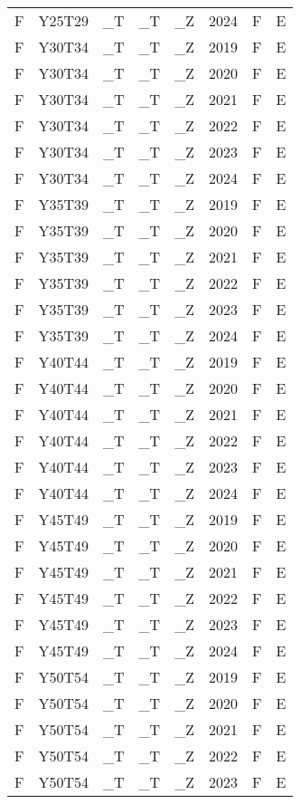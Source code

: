 \begin{longtable}[t]{llllllll}
F & Y25T29 & \_T & \_T & \_Z & 2024 & F & E\\
F & Y30T34 & \_T & \_T & \_Z & 2019 & F & E\\
F & Y30T34 & \_T & \_T & \_Z & 2020 & F & E\\
\addlinespace
F & Y30T34 & \_T & \_T & \_Z & 2021 & F & E\\
F & Y30T34 & \_T & \_T & \_Z & 2022 & F & E\\
F & Y30T34 & \_T & \_T & \_Z & 2023 & F & E\\
F & Y30T34 & \_T & \_T & \_Z & 2024 & F & E\\
F & Y35T39 & \_T & \_T & \_Z & 2019 & F & E\\
\addlinespace
F & Y35T39 & \_T & \_T & \_Z & 2020 & F & E\\
F & Y35T39 & \_T & \_T & \_Z & 2021 & F & E\\
F & Y35T39 & \_T & \_T & \_Z & 2022 & F & E\\
F & Y35T39 & \_T & \_T & \_Z & 2023 & F & E\\
F & Y35T39 & \_T & \_T & \_Z & 2024 & F & E\\
\addlinespace
F & Y40T44 & \_T & \_T & \_Z & 2019 & F & E\\
F & Y40T44 & \_T & \_T & \_Z & 2020 & F & E\\
F & Y40T44 & \_T & \_T & \_Z & 2021 & F & E\\
F & Y40T44 & \_T & \_T & \_Z & 2022 & F & E\\
F & Y40T44 & \_T & \_T & \_Z & 2023 & F & E\\
\addlinespace
F & Y40T44 & \_T & \_T & \_Z & 2024 & F & E\\
F & Y45T49 & \_T & \_T & \_Z & 2019 & F & E\\
F & Y45T49 & \_T & \_T & \_Z & 2020 & F & E\\
F & Y45T49 & \_T & \_T & \_Z & 2021 & F & E\\
F & Y45T49 & \_T & \_T & \_Z & 2022 & F & E\\
\addlinespace
F & Y45T49 & \_T & \_T & \_Z & 2023 & F & E\\
F & Y45T49 & \_T & \_T & \_Z & 2024 & F & E\\
F & Y50T54 & \_T & \_T & \_Z & 2019 & F & E\\
F & Y50T54 & \_T & \_T & \_Z & 2020 & F & E\\
F & Y50T54 & \_T & \_T & \_Z & 2021 & F & E\\
\addlinespace
F & Y50T54 & \_T & \_T & \_Z & 2022 & F & E\\
F & Y50T54 & \_T & \_T & \_Z & 2023 & F & E\\

\end{longtable}
